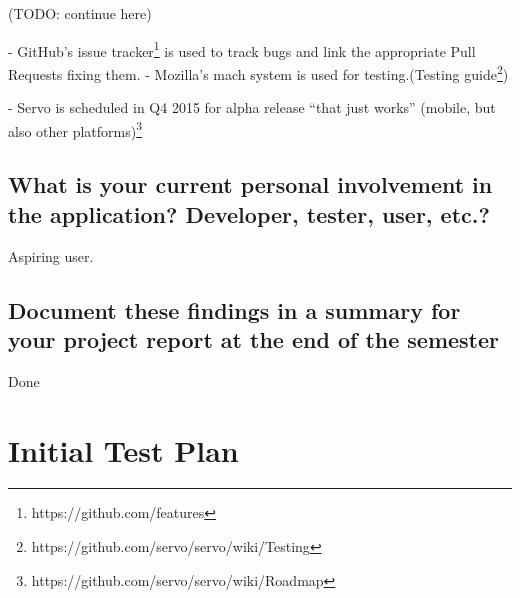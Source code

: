\documentclass{scrartcl}
\newcommand{\todo}[1] {{\color{red}(TODO: #1)}}
\begin{document}
\todo{ continue here}

- GitHub's issue tracker\footnote{https://github.com/features} is used to track bugs and link the appropriate Pull Requests fixing them.
- Mozilla's mach system is used for testing.(Testing guide\footnote{https://github.com/servo/servo/wiki/Testing})


- Servo is scheduled in Q4 2015 for alpha release ``that just works'' (mobile, but also other platforms)\footnote{https://github.com/servo/servo/wiki/Roadmap}

\subsection*{What is your current personal involvement in the
application? Developer, tester, user, etc.?}
Aspiring user.

\subsection*{Document these findings in a summary for your project report at the end of the semester}
Done\\

\section{Initial Test Plan}
\end{document}

